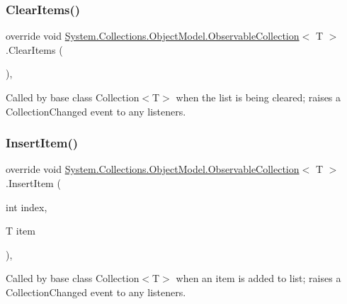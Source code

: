 \subsubsection{\texorpdfstring{Clear\+Items()}{ClearItems()}}
{\footnotesize\ttfamily override void \hyperlink{class_system_1_1_collections_1_1_object_model_1_1_observable_collection}{System.\+Collections.\+Object\+Model.\+Observable\+Collection}$<$ T $>$.Clear\+Items (\begin{DoxyParamCaption}{ }\end{DoxyParamCaption})\hspace{0.3cm}{\ttfamily [inline]}, {\ttfamily [protected]}}



Called by base class Collection$<$T$>$ when the list is being cleared; raises a Collection\+Changed event to any listeners. 

\mbox{\label{class_system_1_1_collections_1_1_object_model_1_1_observable_collection_a8dd80a97bec92509f72bd6e6f35d889d}} 
\subsubsection{\texorpdfstring{Insert\+Item()}{InsertItem()}}
{\footnotesize\ttfamily override void \hyperlink{class_system_1_1_collections_1_1_object_model_1_1_observable_collection}{System.\+Collections.\+Object\+Model.\+Observable\+Collection}$<$ T $>$.Insert\+Item (\begin{DoxyParamCaption}\item[{int}]{index,  }\item[{T}]{item }\end{DoxyParamCaption})\hspace{0.3cm}{\ttfamily [inline]}, {\ttfamily [protected]}}



Called by base class Collection$<$T$>$ when an item is added to list; raises a Collection\+Changed event to any listeners. 

\mbox{\label{class_system_1_1_collections_1_1_object_model_1_1_observable_collection_a15feef0acd33526bece93362d784d53b}} 
